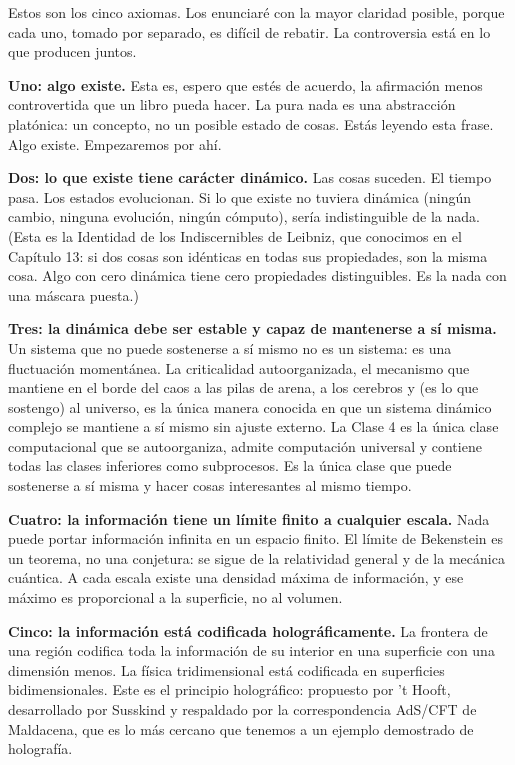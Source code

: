 \documentclass[11pt, twoside, openright]{book}
\begin{document}
Estos son los cinco axiomas. Los enunciaré con la mayor claridad posible, porque cada uno, tomado por separado, es difícil de rebatir. La controversia está en lo que producen juntos.

\textbf{Uno: algo existe.} Esta es, espero que estés de acuerdo, la afirmación menos controvertida que un libro pueda hacer. La pura nada es una abstracción platónica: un concepto, no un posible estado de cosas. Estás leyendo esta frase. Algo existe. Empezaremos por ahí.

\textbf{Dos: lo que existe tiene carácter dinámico.} Las cosas suceden. El tiempo pasa. Los estados evolucionan. Si lo que existe no tuviera dinámica (ningún cambio, ninguna evolución, ningún cómputo), sería indistinguible de la nada. (Esta es la Identidad de los Indiscernibles de Leibniz, que conocimos en el Capítulo 13: si dos cosas son idénticas en todas sus propiedades, son la misma cosa. Algo con cero dinámica tiene cero propiedades distinguibles. Es la nada con una máscara puesta.)

\textbf{Tres: la dinámica debe ser estable y capaz de mantenerse a sí misma.} Un sistema que no puede sostenerse a sí mismo no es un sistema: es una fluctuación momentánea. La criticalidad autoorganizada, el mecanismo que mantiene en el borde del caos a las pilas de arena, a los cerebros y (es lo que sostengo) al universo, es la única manera conocida en que un sistema dinámico complejo se mantiene a sí mismo sin ajuste externo. La Clase 4 es la única clase computacional que se autoorganiza, admite computación universal y contiene todas las clases inferiores como subprocesos. Es la única clase que puede sostenerse a sí misma y hacer cosas interesantes al mismo tiempo.

\textbf{Cuatro: la información tiene un límite finito a cualquier escala.} Nada puede portar información infinita en un espacio finito. El límite de Bekenstein es un teorema, no una conjetura: se sigue de la relatividad general y de la mecánica cuántica. A cada escala existe una densidad máxima de información, y ese máximo es proporcional a la superficie, no al volumen.

\textbf{Cinco: la información está codificada holográficamente.} La frontera de una región codifica toda la información de su interior en una superficie con una dimensión menos. La física tridimensional está codificada en superficies bidimensionales. Este es el principio holográfico: propuesto por 't Hooft, desarrollado por Susskind y respaldado por la correspondencia AdS/\allowbreak{}CFT de Maldacena, que es lo más cercano que tenemos a un ejemplo demostrado de holografía.
\end{document}
